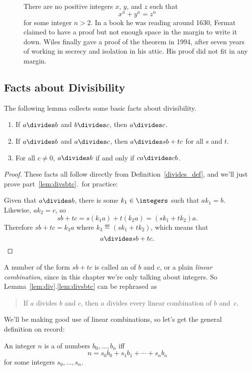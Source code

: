 {\begin{description}
\item[] There are no positive integers $x$,
$y$, and $z$ such that
%
\[
x^n + y^n = z^n
\]
%
for some integer $n > 2$.  In a book he was reading around 1630,
Fermat claimed to have a proof but not enough space in the margin to
write it down.  Wiles finally gave a proof of the theorem in 1994,
after seven years of working in secrecy and isolation in his attic.
His proof did not fit in any margin.

\end{description}
}

\subsection{Facts about Divisibility}

The following lemma collects some basic facts about divisibility.

\begin{lemma}\label{lem:div}\mbox{}
\begin{enumerate}

\item\label{lem:divtrans} If $a \divides b$ and $b \divides c$, then $a \divides c$.

\item\label{lem:divsbtc} If $a \divides b$ and $a \divides c$,
then $a \divides sb + tc$ for all $s$ and $t$.

\item\label{lem:divcancel} For all $c \neq 0$, $a \divides b$ if and only if $ca \divides cb$.
\end{enumerate}
\end{lemma}

\begin{proof}
These facts all follow directly from Definition~\ref{divides_def}, and
we'll just prove part~\ref{lem:divsbtc}.\ for practice:

Given that $a \divides b$, there is some $k_1 \in \integers$ such that
$a k_1 = b$.  Likewise, $a k_2 = c$, so
\[
sb+tc= s(k_1a) + t(k_2a) = (sk_1+tk_2)a.
\]
Therefore $sb+tc = k_3a$ where $k_3 \eqdef (sk_1+tk_2)$, which means
that
\[
a \divides sb+tc.
\]
\end{proof}

A number of the form $sb+tc$ is called an  of $b$ and $c$, or a plain \emph{linear combination},
since in this chapter we're only talking about integers.  So
Lemma~\ref{lem:div}.\ref{lem:divsbtc} can be rephrased as
\begin{quote}
If $a$ divides $b$ and $c$, then $a$ divides every linear combination
of $b$ and~$c$.
\end{quote}
We'll be making good use of linear combinations, so let's get the general
definition on record:
\begin{definition}\label{linear_def}
An integer $n$ is a  of numbers
$b_0,\dots,b_n$ iff
\[
n = s_0b_0+s_1b_1+\cdots+s_nb_n
\]
for some integers $s_0,\dots,s_n$.
\end{definition}

